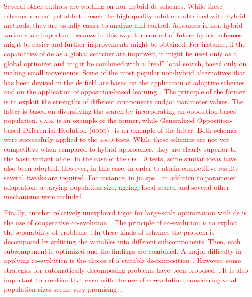 \documentclass[preprint,3p]{elsarticle}
\newcommand{\DE}{{\sc de}}
\begin{document}
\textcolor{red}{
Several other authors are working on non-hybrid \DE{} schemes.
%
While these schemes are not yet able to reach the high-quality solutions obtained with hybrid methods, they are usually easier to analyze and control.
%
Advances in non-hybrid variants are important because in this way, the control of future hybrid schemes might be easier and further improvements might be obtained.
%
For instance, if the capabilities of \DE{} as a global searcher are improved, it might be used only as a global optimizer and might be combined 
with a ``real'' local search, based only on making small movements.
%
Some of the most popular non-hybrid alternatives that has been devised in the \DE{} field are based on the application of adaptive schemes~\cite{Yang:11} and on the application of 
opposition-based learning~\cite{Wang:11b}.
%
The principle of the former is to exploit the strengths of different components and/or parameter values.
%
The latter is based on diversifying the search by incorporating an opposition-based population.
%
\textsc{gade} is an example of the former, while Generalized Opposition-based Differential Evolution (\textsc{gode})~\cite{Wang:11b} is an example of the latter.
%
Both schemes were successfully applied to the \textsc{soco} tests.
%
While these schemes are not yet competitive when compared to hybrid approaches, they are clearly superior to the basic variant of \DE{}.
%
%
In the case of the \textsc{cec'10} tests, some similar ideas have also been adopted.
%
However, in this case, in order to attain competitive results several tweaks are required.
%
For instance, in j\textsc{de}sps~\cite{Brest:12}, in addition to parameter adaptation, a varying population size, ageing, local search and several
other mechanisms were included.
}

\textcolor{red}{
Finally, another relatively unexplored topic for large-scale optimization with \DE{} is the use of cooperative co-evolution~\cite{Potter:94}.
%
The principle of co-evolution is to exploit the separability of problems~\cite{Weise:12}.
%
In these kinds of schemes the problem is decomposed by splitting the variables into different subcomponents.
Then, each subcomponent is optimized and the findings are combined.
%
A major difficulty in applying co-evolution is the choice of a
suitable decomposition~\cite{Shi:05,Olorunda:07}.
%
However, some strategies for automatically decomposing problems have been proposed~\cite{Yang:08,Nabi:13}.
%
It is also important to mention that even with the use of co-evolution, considering
small population sizes seems very promising~\cite{Parsopoulos:09}.
}
\end{document}
